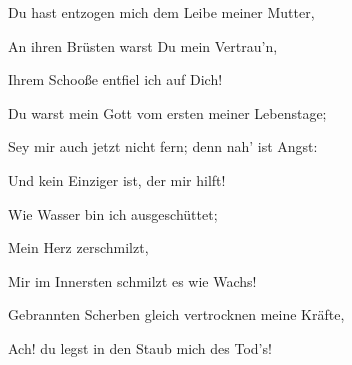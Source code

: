 \begin{aufza}
{\begin{aufzb}\item[]
\par
{}\par
\end{aufzb}\par
Du hast entzogen mich dem Leibe meiner Mutter,\par
\begin{aufzb}\item[]
An ihren Brüsten warst Du mein Vertrau'n,\par
Ihrem Schooße entfiel ich auf Dich!\par
\end{aufzb}\par
Du warst mein Gott vom ersten meiner Lebenstage;\par
\begin{aufzb}\item[]
Sey mir auch jetzt nicht fern; denn nah' ist Angst:\par
Und kein Einziger ist, der mir hilft!\par
\end{aufzb}\par
{}\par
\begin{aufzb}\item[]
\par
{}\par
\end{aufzb}\par
Wie Wasser bin ich ausgeschüttet; \par
\begin{aufzb}\item[]
 Mein Herz zerschmilzt,\par
Mir im Innersten schmilzt es wie Wachs!\par
\end{aufzb}\par
Gebrannten Scherben gleich vertrocknen meine Kräfte,\par
\begin{aufzb}\item[]
\par
Ach! du legst in den Staub mich des Tod's!\par

\end{aufzb}}
\end{aufza}
